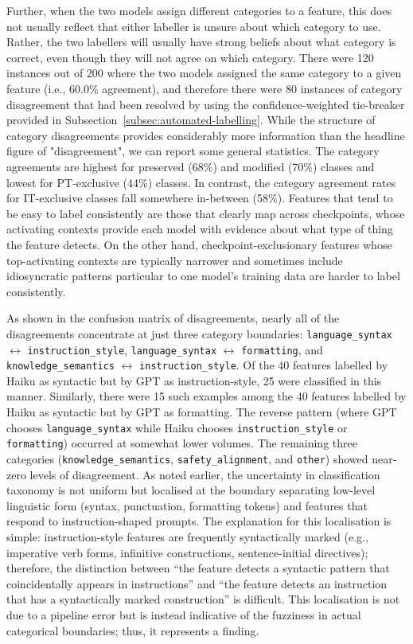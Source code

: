 Further, when the two models assign different categories to a feature, this does not usually reflect that either labeller is unsure about which category to use. Rather, the two labellers will usually have strong beliefs about what category is correct, even though they will not agree on which category. There were 120 instances out of 200 where the two models assigned the same category to a given feature (i.e., 60.0\% agreement), and therefore there were 80 instances of category disagreement that had been resolved by using the confidence-weighted tie-breaker provided in Subsection~\ref{subsec:automated-labelling}. While the structure of category disagreements provides considerably more information than the headline figure of "disagreement", we can report some general statistics. The category agreements are highest for preserved (68\%) and modified (70\%) classes and lowest for PT-exclusive (44\%) classes. In contrast, the category agreement rates for IT-exclusive classes fall somewhere in-between (58\%). Features that tend to be easy to label consistently are those that clearly map across checkpoints, whose activating contexts provide each model with evidence about what type of thing the feature detects. On the other hand, checkpoint-exclusionary features whose top-activating contexts are typically narrower and sometimes include idiosyncratic patterns particular to one model's training data are harder to label consistently.

As shown in the confusion matrix of disagreements, nearly all of the disagreements concentrate at just three category boundaries: \texttt{language\_syntax} $\leftrightarrow$ \texttt{instruction\_style}, \texttt{language\_syntax} $\leftrightarrow$ \texttt{formatting}, and \texttt{knowledge\_semantics} $\leftrightarrow$ \texttt{instruction\_style}. Of the 40 features labelled by Haiku as syntactic but by GPT as instruction-style, 25 were classified in this manner. Similarly, there were 15 such examples among the 40 features labelled by Haiku as syntactic but by GPT as formatting. The reverse pattern (where GPT chooses \texttt{language\_syntax} while Haiku chooses \texttt{instruction\_style} or \texttt{formatting}) occurred at somewhat lower volumes. The remaining three categories (\texttt{knowledge\_semantics}, \texttt{safety\_alignment}, and \texttt{other}) showed near-zero levels of disagreement. As noted earlier, the uncertainty in classification taxonomy is not uniform but localised at the boundary separating low-level linguistic form (syntax, punctuation, formatting tokens) and features that respond to instruction-shaped prompts. The explanation for this localisation is simple: instruction-style features are frequently syntactically marked (e.g., imperative verb forms, infinitive constructions, sentence-initial directives); therefore, the distinction between ``the feature detects a syntactic pattern that coincidentally appears in instructions'' and ``the feature detects an instruction that has a syntactically marked construction'' is difficult. This localisation is not due to a pipeline error but is instead indicative of the fuzziness in actual categorical boundaries; thus, it represents a finding.

